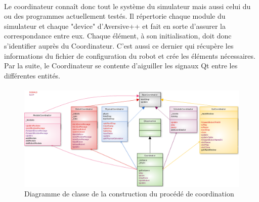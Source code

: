 \paragraph{}
Le coordinateur connaît donc tout le système du simulateur mais aussi celui du ou des programmes actuellement testés. Il répertorie chaque module du simulateur et chaque "device" d'Aversive++ et fait en sorte d'assurer la correspondance entre eux. Chaque élément, à son initialisation, doit donc s'identifier auprès du Coordinateur. C'est aussi ce dernier qui récupère les informations du fichier de configuration du robot et crée les éléments nécessaires. Par la suite, le Coordinateur se contente d'aiguiller les signaux Qt entre les différentes entités.

\paragraph{}

\begin{figure}[!h]
\includegraphics[scale=0.5, angle=90]{DiagClasseCoord.png}
\caption{Diagramme de classe de la construction du procédé de coordination}
\label{coordinatorsarchitecture}
\end{figure}
\clearpage

